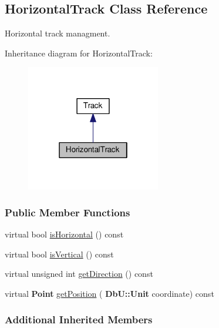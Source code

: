 \hypertarget{classKite_1_1HorizontalTrack}{}\subsection{Horizontal\+Track Class Reference}
\label{classKite_1_1HorizontalTrack}


Horizontal track managment.  




Inheritance diagram for Horizontal\+Track\+:\nopagebreak
\begin{figure}[H]
\begin{center}
\leavevmode
\includegraphics[width=166pt]{classKite_1_1HorizontalTrack__inherit__graph}
\end{center}
\end{figure}
\subsubsection*{Public Member Functions}
\begin{DoxyCompactItemize}
\item 
virtual bool \hyperlink{classKite_1_1HorizontalTrack_a21b9cefd33ae22e4c2070ad441bdd30b}{is\+Horizontal} () const
\item 
virtual bool \hyperlink{classKite_1_1HorizontalTrack_abd54544ef1710ee4b67cfb021d73446c}{is\+Vertical} () const
\item 
virtual unsigned int \hyperlink{classKite_1_1HorizontalTrack_a0dd7cf705ace42c662c289955313b2e9}{get\+Direction} () const
\item 
virtual \textbf{ Point} \hyperlink{classKite_1_1HorizontalTrack_a6ab4f8026e4500918aa8721f1199f8b6}{get\+Position} (\textbf{ Db\+U\+::\+Unit} coordinate) const
\end{DoxyCompactItemize}
\subsubsection*{Additional Inherited Members}


